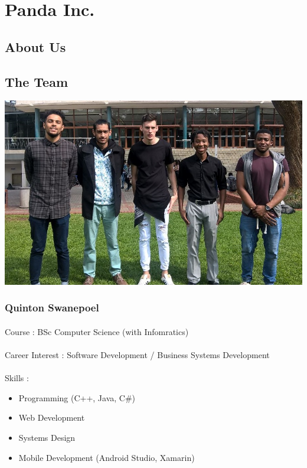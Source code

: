 \documentclass[11pt]{article}
\begin{document}
\newpage
\tableofcontents
\newpage

\section{Panda Inc.}
\subsection{About Us}


\subsection{The Team}
\includegraphics[width=\textwidth]{Images/Team_Pic.jpg}

\subsubsection{Quinton Swanepoel} 
\paragraph{}Course : BSc Computer Science (with Infomratics)
\paragraph{}Career Interest : Software Development / Business Systems Development  
\paragraph{}Skills : 
\begin{itemize}
\item Programming (C++, Java, C\#)
\item Web Development
\item Systems Design
\item Mobile Development (Android Studio, Xamarin)
\end{itemize}
\end{document}
